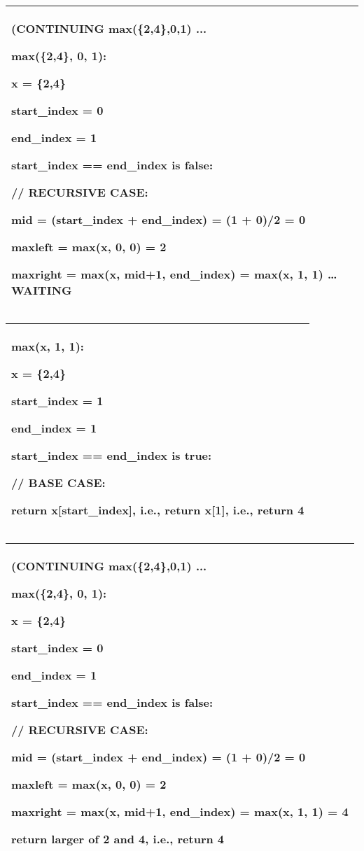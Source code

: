 \documentclass[
]{article}
\begin{document}
\begin{longtable}[]{@{}l@{}}
\toprule
\endhead
\begin{minipage}[t]{0.97\columnwidth}\raggedright
(CONTINUING max(\{2,4\},0,1) ...

max(\{2,4\}, 0, 1):

x = \{2,4\}

start\_index = 0

end\_index = 1

start\_index == end\_index is false:

// RECURSIVE CASE:

mid = (start\_index + end\_index) = (1 + 0)/2 = 0

maxleft = max(x, 0, 0) = 2

maxright = max(x, mid+1, end\_index) = max(x, 1, 1) \ldots{}
WAITING\strut
\end{minipage}\tabularnewline
\bottomrule
\end{longtable}

\begin{longtable}[]{@{}l@{}}
\toprule
\endhead
\begin{minipage}[t]{0.97\columnwidth}\raggedright
max(x, 1, 1):

x = \{2,4\}

start\_index = 1

end\_index = 1

start\_index == end\_index is true:

// BASE CASE:

return x{[}start\_index{]}, i.e., return x{[}1{]}, i.e., return 4\strut
\end{minipage}\tabularnewline
\bottomrule
\end{longtable}

\begin{longtable}[]{@{}l@{}}
\toprule
\endhead
\begin{minipage}[t]{0.97\columnwidth}\raggedright
(CONTINUING max(\{2,4\},0,1) ...

max(\{2,4\}, 0, 1):

x = \{2,4\}

start\_index = 0

end\_index = 1

start\_index == end\_index is false:

// RECURSIVE CASE:

mid = (start\_index + end\_index) = (1 + 0)/2 = 0

maxleft = max(x, 0, 0) = 2

maxright = max(x, mid+1, end\_index) = max(x, 1, 1) = 4

return larger of 2 and 4, i.e., return 4\strut
\end{minipage}\tabularnewline
\bottomrule
\end{longtable}
\end{document}
